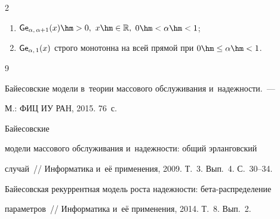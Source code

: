 \begin{multicols}{2}
\begin{enumerate}


\item $\G_{\alpha,\, \alpha + 1}(x)\hm > 0,$ $x\hm\in\mathbb{R},$ $0\hm<\alpha\hm<1$;


\item ${\sf Ge}_{\alpha,\, 1}(x)$ строго монотонна на всей прямой при $0\hm\le\alpha\hm<1$.


\end{enumerate}

















{\small\frenchspacing


 {%




 \begin{thebibliography}{9}









Байесовские модели в~тео\-рии массового обслуживания и~надежности.~--- 


М.: ФИЦ ИУ РАН, 2015. 76~с.







 Байе\-сов\-ские


модели массового обслуживания и~надежности: общий эрланговский


случай~// Информатика и~её применения, 2009. Т.~3. Вып.~4. С.~30--34.









Байесовская рекуррентная модель роста надежности: бе\-та-рас\-пре\-де\-ле\-ние


параметров~// Информатика и~её применения, 2014. Т.~8. Вып.~2.



\end{thebibliography}}}
\end{multicols}
